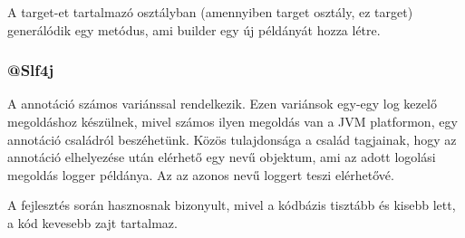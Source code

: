 A target-et tartalmazó osztályban (amennyiben target osztály, ez target)  generálódik egy  metódus, ami builder egy új példányát hozza létre. \par


\subsubsection{@Slf4j}

A  annotáció számos variánssal rendelkezik. Ezen variánsok egy-egy log kezelő megoldáshoz készülnek, mivel számos ilyen megoldás van a JVM platformon, egy annotáció családról beszéhetünk. Közös tulajdonsága a család tagjainak, hogy az annotáció elhelyezése után elérhető egy  nevű objektum, ami az adott logolási megoldás logger példánya. Az  az azonos nevű loggert teszi elérhetővé. \par

A fejlesztés során hasznosnak bizonyult, mivel a kódbázis tisztább és kisebb lett, a kód kevesebb zajt tartalmaz.




